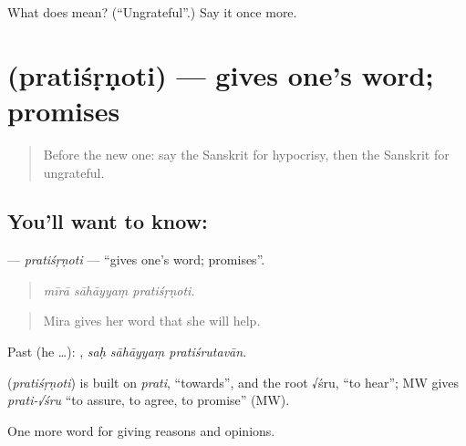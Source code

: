 \begin{tcolorbox}[breakable,colback=teal!4,colframe=teal!35!black,title={Before you move on}]
What does  mean? (\textquotedblleft{}Ungrateful\textquotedblright{}.) Say it once more.
\end{tcolorbox}
\section[\texorpdfstring{\sk{प्रतिशृणोति} (pratiśṛṇoti)}{प्रतिशृणोति (pratiśṛṇoti)}]{ (pratiśṛṇoti) — gives one's word; promises}

\label{lesson:SA-C361-pratisrnoti}



\begin{quote}
Before the new one: say the Sanskrit for hypocrisy, then the Sanskrit for ungrateful.
\end{quote}

\subsection*{You'll want to know: }
\textbf{} — \emph{pratiśṛṇoti} — \textquotedblleft{}gives one's word; promises\textquotedblright{}.

\begin{quote}
  
\end{quote}

\begin{quote}
\emph{mīrā sāhāyyaṃ pratiśṛṇoti.}
\end{quote}

\begin{quote}
Mira gives her word that she will help.
\end{quote}

Past (he …):   , \emph{saḥ sāhāyyaṃ pratiśrutavān}.

\begin{cousinweb}
\textbf{} (\emph{pratiśṛṇoti}) is built on \emph{prati}, \textquotedblleft{}towards\textquotedblright{}, and the root √śru, \textquotedblleft{}to hear\textquotedblright{}; MW gives \emph{prati-√śru} \textquotedblleft{}to assure, to agree, to promise\textquotedblright{} (MW).
\end{cousinweb}

\begin{grammarlens}[title={What you've built}]
One more word for giving reasons and opinions.
\end{grammarlens}

